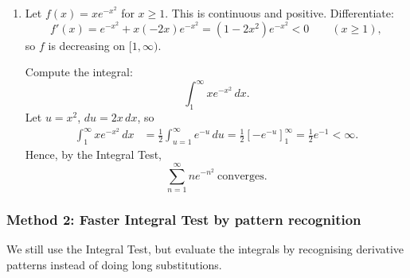 \documentclass[12pt]{article}
\begin{document}
\begin{enumerate}[label=(\alph*)]
Now compute the integral for \(x\ge 2\):
\[
\int_2^\infty \frac{x^3}{x^4+4}\,dx.
\]
Use substitution \(u=x^4+4\), \(du=4x^3\,dx\), hence
\begin{align*}
\int_2^\infty \frac{x^3}{x^4+4}\,dx
&=\frac14 \int_{u=2^4+4}^{\infty}\frac{1}{u}\,du
=\frac14\left[\ln u\right]_{20}^{\infty}
=\infty.
\end{align*}
So the improper integral diverges, and by the Integral Test,
\[
\boxed{\sum_{n=1}^{\infty}\frac{n^3}{n^4+4}\ \text{diverges}.}
\]

\item Let \(f(x)=x e^{-x^2}\) for \(x\ge 1\). This is continuous and positive.
Differentiate:
\[
f'(x)= e^{-x^2}+x(-2x)e^{-x^2}=(1-2x^2)e^{-x^2}<0\qquad (x\ge 1),
\]
so \(f\) is decreasing on \([1,\infty)\).

Compute the integral:
\[
\int_1^\infty x e^{-x^2}\,dx.
\]
Let \(u=x^2\), \(du=2x\,dx\), so
\begin{align*}
\int_1^\infty x e^{-x^2}\,dx
&=\frac12\int_{u=1}^{\infty} e^{-u}\,du
=\frac12\left[-e^{-u}\right]_{1}^{\infty}
=\frac12 e^{-1}<\infty.
\end{align*}
Hence, by the Integral Test,
\[
\boxed{\sum_{n=1}^{\infty}n e^{-n^2}\ \text{converges}.}
\]
\end{enumerate}

\subsubsection*{Method 2: Faster Integral Test by pattern recognition}
We still use the Integral Test, but evaluate the integrals by recognising derivative patterns instead of doing long substitutions.
\end{document}
